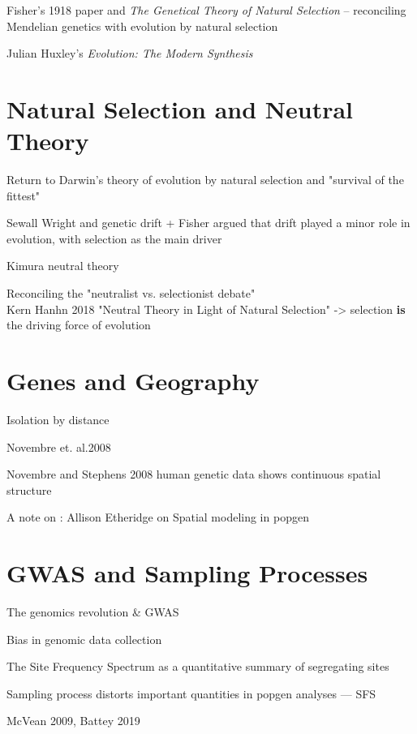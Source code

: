 Fisher's 1918 paper and \textit{The Genetical Theory of Natural Selection} -- reconciling Mendelian genetics with evolution by natural selection


Julian Huxley's \textit{Evolution: The Modern Synthesis}


\section{Natural Selection and Neutral Theory}
Return to Darwin's theory of evolution by natural selection and "survival of the fittest"  


Sewall Wright and genetic drift + Fisher argued that drift played a minor role in evolution, with selection as the main driver


Kimura neutral theory


Reconciling the "neutralist vs. selectionist debate"
\\
Kern Hanhn 2018 "Neutral Theory in Light of Natural Selection" -> selection \textbf{is} the driving force of evolution

\section{Genes and Geography}
Isolation by distance

Novembre et. al.2008


Novembre and Stephens 2008 human genetic data shows continuous spatial structure 


A note on
: Allison Etheridge on Spatial modeling in popgen 

\section{GWAS and Sampling Processes}
The genomics revolution & GWAS


Bias in genomic data collection


The Site Frequency Spectrum as a quantitative summary of segregating sites 


Sampling process distorts important quantities in popgen analyses --- SFS

McVean 2009, Battey 2019 

\newpage
